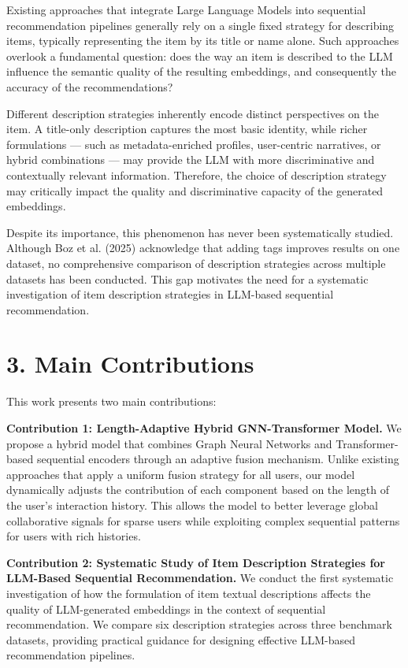 \documentclass[12pt,a4paper]{report}
\begin{document}
\medskip
Existing approaches that integrate Large Language Models into sequential
recommendation pipelines generally rely on a single fixed strategy for describing
items, typically representing the item by its title or name alone. Such approaches
overlook a fundamental question: does the way an item is described to the LLM
influence the semantic quality of the resulting embeddings, and consequently the
accuracy of the recommendations?

Different description strategies inherently encode distinct perspectives on the item.
A title-only description captures the most basic identity, while richer formulations
--- such as metadata-enriched profiles, user-centric narratives, or hybrid
combinations --- may provide the LLM with more discriminative and contextually
relevant information. Therefore, the choice of description strategy may critically
impact the quality and discriminative capacity of the generated embeddings.

Despite its importance, this phenomenon has never been systematically studied.
Although Boz et al. (2025) acknowledge that adding tags improves results on one
dataset, no comprehensive comparison of description strategies across multiple
datasets has been conducted. This gap motivates the need for a systematic
investigation of item description strategies in LLM-based sequential recommendation.


\section*{3. Main Contributions}

This work presents two main contributions:

\medskip
\noindent\textbf{Contribution 1: Length-Adaptive Hybrid GNN-Transformer Model.}
We propose a hybrid model that combines Graph Neural Networks and Transformer-based
sequential encoders through an adaptive fusion mechanism. Unlike existing approaches
that apply a uniform fusion strategy for all users, our model dynamically adjusts
the contribution of each component based on the length of the user's interaction
history. This allows the model to better leverage global collaborative signals for
sparse users while exploiting complex sequential patterns for users with rich
histories.

\medskip
\noindent\textbf{Contribution 2: Systematic Study of Item Description Strategies
for LLM-Based Sequential Recommendation.}
We conduct the first systematic investigation of how the formulation of item textual
descriptions affects the quality of LLM-generated embeddings in the context of
sequential recommendation. We compare six description strategies across three
benchmark datasets, providing practical guidance for designing effective
LLM-based recommendation pipelines.
\end{document}
